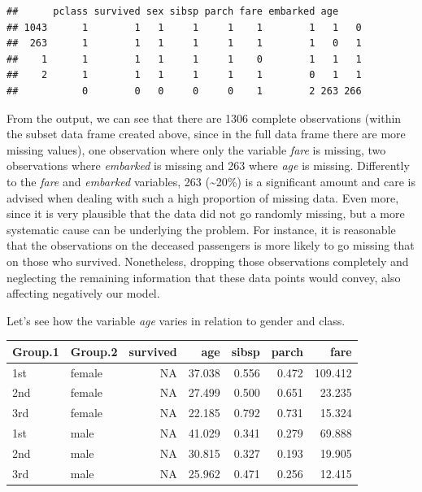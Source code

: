 \documentclass[12,]{article}
\newenvironment{Shaded}{\begin{snugshade}}{\end{snugshade}}
\newcommand{\KeywordTok}[1]{\textcolor[rgb]{0.13,0.29,0.53}{\textbf{#1}}}
\newcommand{\DataTypeTok}[1]{\textcolor[rgb]{0.13,0.29,0.53}{#1}}
\newcommand{\DecValTok}[1]{\textcolor[rgb]{0.00,0.00,0.81}{#1}}
\newcommand{\OtherTok}[1]{\textcolor[rgb]{0.56,0.35,0.01}{#1}}
\newcommand{\OperatorTok}[1]{\textcolor[rgb]{0.81,0.36,0.00}{\textbf{#1}}}
\newcommand{\NormalTok}[1]{#1}
\begin{document}
\begin{verbatim}
##      pclass survived sex sibsp parch fare embarked age    
## 1043      1        1   1     1     1    1        1   1   0
##  263      1        1   1     1     1    1        1   0   1
##    1      1        1   1     1     1    0        1   1   1
##    2      1        1   1     1     1    1        0   1   1
##           0        0   0     0     0    1        2 263 266
\end{verbatim}

From the output, we can see that there are 1306 complete observations
(within the subset data frame created above, since in the full data
frame there are more missing values), one observation where only the
variable \emph{fare} is missing, two observations where \emph{embarked}
is missing and 263 where \emph{age} is missing. Differently to the
\emph{fare} and \emph{embarked} variables, 263 (\textasciitilde{}20\%)
is a significant amount and care is advised when dealing with such a
high proportion of missing data. Even more, since it is very plausible
that the data did not go randomly missing, but a more systematic cause
can be underlying the problem. For instance, it is reasonable that the
observations on the deceased passengers is more likely to go missing
that on those who survived. Nonetheless, dropping those observations
completely and neglecting the remaining information that these data
points would convey, also affecting negatively our model.

Let's see how the variable \emph{age} varies in relation to gender and
class.

\begin{Shaded}
\end{Shaded}

\begin{longtable}[]{@{}llrrrrr@{}}
\toprule
Group.1 & Group.2 & survived & age & sibsp & parch & fare\tabularnewline
\midrule
\endhead
1st & female & NA & 37.038 & 0.556 & 0.472 & 109.412\tabularnewline
2nd & female & NA & 27.499 & 0.500 & 0.651 & 23.235\tabularnewline
3rd & female & NA & 22.185 & 0.792 & 0.731 & 15.324\tabularnewline
1st & male & NA & 41.029 & 0.341 & 0.279 & 69.888\tabularnewline
2nd & male & NA & 30.815 & 0.327 & 0.193 & 19.905\tabularnewline
3rd & male & NA & 25.962 & 0.471 & 0.256 & 12.415\tabularnewline
\bottomrule
\end{longtable}
\end{document}

